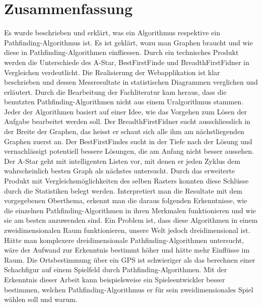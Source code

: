 \section{Zusammenfassung}
Es wurde beschrieben und erklärt, was ein Algorithmus respektive ein Pathfinding-Algorithmus ist. Es ist geklärt, wozu man Graphen braucht und wie diese in Pathfinding-Algorithmen einfliessen. Durch ein technisches Produkt werden die Unterschiede des A-Star, BestFirstFinde und BreadthFirstFidner in Vergleichen verdeutlicht. Die Realisierung der Webapplikation ist klar beschrieben und dessen Messresultate in statistischen Diagrammen verglichen und erläutert. Durch die Bearbeitung der Fachliteratur kam heraus, dass die benutzten Pathfinding-Algorithmen nicht aus einem Uralgorithmus stammen. Jeder der Algorithmen basiert auf einer Idee, wie das Vorgehen zum Lösen der Aufgabe bearbeitet werden soll. Der BreadthFirstFidner sucht ausschliesslich in der Breite der Graphen, das heisst er schaut sich alle ihm am nächstliegenden Graphen zuerst an. Der BestFirstFindes sucht in der Tiefe nach der Lösung und vernachlässigt potentiell bessere Lösungen, die am Anfang nicht besser aussehen. Der A-Star geht mit intelligenten Listen vor, mit denen er jeden Zyklus dem wahrscheinlich besten Graph als nächstes untersucht. Durch das erweiterte Produkt mit Vergleichsmöglichkeiten des selben Rasters konnten diese Schlüsse durch die Statistiken belegt werden. Interpretiert man die Resultate mit dem vorgegebenen Oberthema, erkennt man die daraus folgenden Erkenntnisse, wie die einzelnen Pathfinding-Algorithmen in ihren Merkmalen funktionieren und wie sie am besten anzuwenden sind. Ein Problem ist, dass diese Algorithmen in einem zweidimensionalen Raum funktionieren, unsere Welt jedoch dreidimensional ist. Hätte man komplexere dreidimensionale Pathfinding-Algorithmen untersucht, wäre der Aufwand zur Erkenntnis bestimmt höher und hätte mehr Einflüsse im Raum. Die Ortsbestimmung über ein GPS ist schwieriger als das berechnen einer Schachfigur auf einem Spielfeld durch Pathfinding-Algorithmen. Mit der Erkenntnis dieser Arbeit kann beispielsweise ein Spieleentwickler besser bestimmen, welchen Pathfinding-Algorithmus er für sein zweidimensionales Spiel wählen soll und warum.
